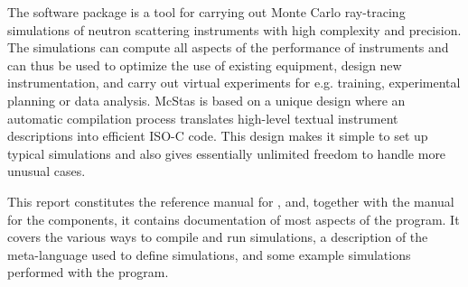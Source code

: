 The software package \MCS is a tool for carrying out Monte Carlo
ray-tracing simulations of neutron scattering instruments with high
complexity and precision. The simulations can compute all aspects of the
performance of instruments and can thus be used to optimize the use of
existing equipment, design new instrumentation, and carry out virtual
experiments for e.g. training, experimental planning or data analysis. McStas
is based on a unique design where an automatic compilation process
translates high-level textual instrument descriptions into efficient
ISO-C code. This design makes it simple to set up typical simulations
and also gives essentially unlimited freedom to handle more unusual
cases.

This report constitutes the reference manual for \MCS, and,
together with the manual for the \MCS components, it
contains documentation of most aspects of the program. It covers
the various ways to compile and run simulations, a description of the
meta-language used to define simulations, 
and some example simulations performed with
the program.
